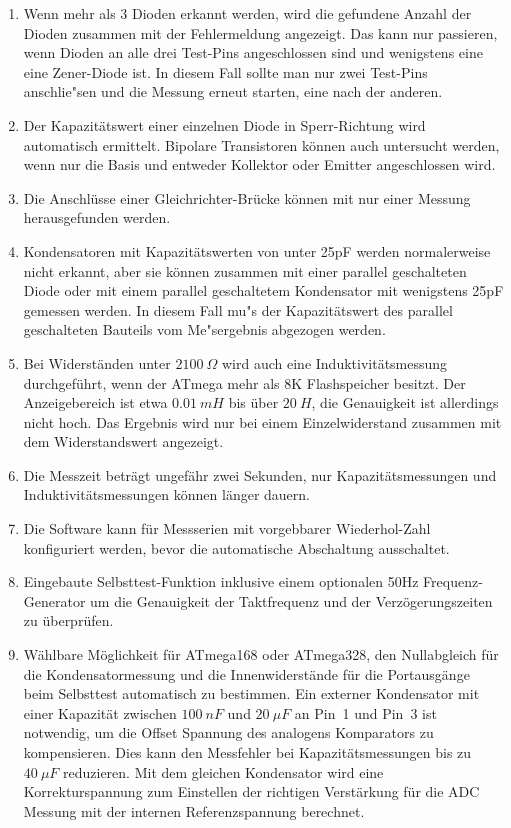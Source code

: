 \begin{enumerate}
\item Wenn mehr als 3 Dioden erkannt werden, wird die gefundene Anzahl der Dioden zusammen mit der Fehlermeldung angezeigt.
Das kann nur passieren, wenn Dioden an alle drei Test-Pins angeschlossen sind und wenigstens eine eine Zener-Diode ist.
In diesem Fall sollte man nur zwei Test-Pins anschlie"sen und die Messung erneut starten, eine nach der anderen.
\item Der Kapazit\"atswert einer einzelnen Diode in Sperr-Richtung wird automatisch ermittelt.
Bipolare Transistoren k\"onnen auch untersucht werden, wenn nur die Basis und entweder Kollektor oder Emitter angeschlossen wird.
\item Die Anschl\"usse einer Gleichrichter-Br\"ucke k\"onnen mit nur einer Messung herausgefunden werden.
\item Kondensatoren mit Kapazit\"atswerten von unter 25pF werden normalerweise nicht erkannt, 
aber sie k\"onnen zusammen mit einer parallel geschalteten Diode oder mit einem parallel geschaltetem Kondensator mit
wenigstens 25pF gemessen werden.
In diesem Fall mu"s der Kapazit\"atswert des parallel geschalteten Bauteils vom Me"sergebnis abgezogen werden.
\item Bei Widerst\"anden unter \(2100~\Omega\) wird auch eine Induktivit\"atsmessung durchgef\"uhrt, wenn der
ATmega mehr als 8K Flashspeicher besitzt.
Der Anzeigebereich ist etwa \(0.01~mH\) bis \"uber \(20~H\), die Genauigkeit ist allerdings nicht hoch.
Das Ergebnis wird nur bei einem Einzelwiderstand zusammen mit dem Widerstandswert angezeigt.
\item Die Messzeit betr\"agt ungef\"ahr zwei Sekunden, nur Kapazit\"atsmessungen und Induktivit\"atsmessungen k\"onnen l\"anger dauern.
\item Die Software kann f\"ur Messserien mit vorgebbarer Wiederhol-Zahl konfiguriert werden, bevor die automatische Abschaltung ausschaltet.
\item Eingebaute Selbsttest-Funktion inklusive einem optionalen 50Hz Frequenz-Generator um die Genauigkeit der Taktfrequenz
und der Verz\"ogerungszeiten zu \"uberpr\"ufen.
\item W\"ahlbare M\"oglichkeit f\"ur ATmega168 oder ATmega328, den Nullabgleich f\"ur die Kondensatormessung und die Innenwiderst\"ande f\"ur die
Portausg\"ange beim Selbsttest automatisch zu bestimmen.
Ein externer Kondensator mit einer Kapazit\"at zwischen \(100~nF\) und \(20~\mu F\) an Pin~1 und Pin~3 ist notwendig, 
um die Offset Spannung des analogens Komparators zu kompensieren.
Dies kann den Messfehler bei Kapazit\"atsmessungen bis zu \(40~\mu F\) reduzieren.
Mit dem gleichen Kondensator wird eine Korrekturspannung zum Einstellen der richtigen Verst\"arkung f\"ur
die ADC Messung mit der internen Referenzspannung berechnet.
\end{enumerate}

